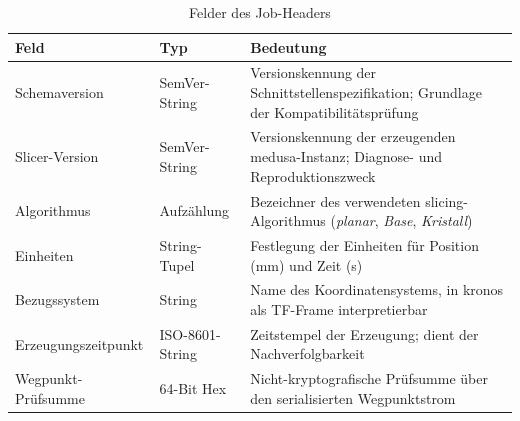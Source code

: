                 \begin{table}[ht]
                    \centering
                    \caption[Felder des Job-Headers]{Felder des Job-Headers}
                    \label{tab:interface-header-fields}
                    \begin{tabular}{@{} l l p{6.5cm} @{}}
                        \toprule
                        \textbf{Feld} & \textbf{Typ} & \textbf{Bedeutung} \\
                        \midrule
                        Schemaversion       & SemVer-String   & Versionskennung der Schnittstellenspezifikation; Grundlage der Kompatibilitätsprüfung \\
                        Slicer-Version      & SemVer-String   & Versionskennung der erzeugenden \ac{medusa}-Instanz; Diagnose- und Reproduktionszweck \\
                        Algorithmus         & Aufzählung      & Bezeichner des verwendeten \gls{slicing}-Algorithmus (\emph{planar}, \emph{Base}, \emph{Kristall}) \\
                        Einheiten           & String-Tupel    & Festlegung der Einheiten für Position (\si{mm}) und Zeit (\si{s}) \\
                        Bezugssystem        & String          & Name des Koordinatensystems, in \ac{kronos} als TF-Frame interpretierbar \\
                        Erzeugungszeitpunkt & ISO-8601-String & Zeitstempel der Erzeugung; dient der Nachverfolgbarkeit \\
                        Wegpunkt-Prüfsumme  & 64-Bit Hex      & Nicht-kryptografische Prüfsumme über den serialisierten Wegpunktstrom \\
                        \bottomrule
                    \end{tabular}
                \end{table}

